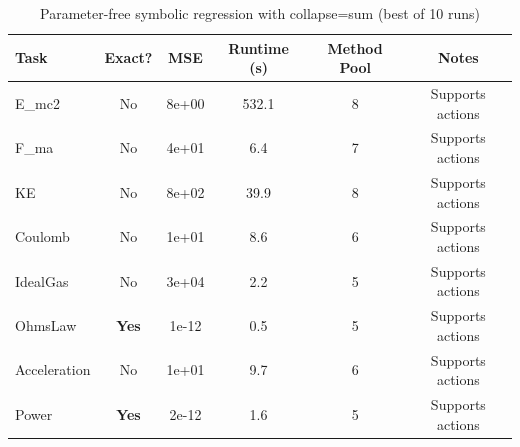 \begin{table}[htbp]
\centering
\caption{Parameter-free symbolic regression with collapse=sum (best of 10 runs)}
\label{tab:baselines_sum}
\begin{tabular}{lccccc}
\toprule
Task & Exact? & MSE & Runtime (s) & Method Pool & Notes \\
\midrule
E\_mc2 & No & 8e+00 & 532.1 & 8 & Supports actions \\
F\_ma & No & 4e+01 & 6.4 & 7 & Supports actions \\
KE & No & 8e+02 & 39.9 & 8 & Supports actions \\
Coulomb & No & 1e+01 & 8.6 & 6 & Supports actions \\
IdealGas & No & 3e+04 & 2.2 & 5 & Supports actions \\
OhmsLaw & \textbf{Yes} & 1e-12 & 0.5 & 5 & Supports actions \\
Acceleration & No & 1e+01 & 9.7 & 6 & Supports actions \\
Power & \textbf{Yes} & 2e-12 & 1.6 & 5 & Supports actions \\
\bottomrule
\end{tabular}
\end{table}

